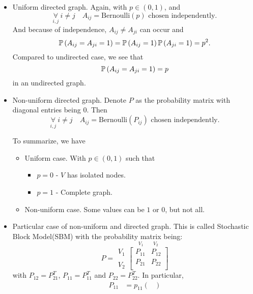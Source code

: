 \begin{itemize}
	\item Uniform directed graph. Again, with \(p\in(0, 1)\), and
	      \[
		      \underset{i, j}{\forall}\ i\neq j\quad A_{ij}= \mathrm{Bernoulli}(p) \text{ chosen independently}.
	      \]
	      And because of independence, \(A_{ij}\neq A_{ji}\) can occur and
	      \[
		      \mathbb{\MakeUppercase{P}}\left( A_{ij} = A_{ji} = 1 \right) = \mathbb{\MakeUppercase{P}}\left( A_{ij} = 1 \right) \mathbb{\MakeUppercase{P}}\left( A_{ji} = 1 \right) = p^2.
	      \]
	      Compared to undirected case, we see that
	      \[
		      \mathbb{\MakeUppercase{P}}\left( A_{ij} = A_{ji} = 1 \right) = p
	      \]
	      in an undirected graph.
	\item Non-uniform directed graph. Denote \(P\) as the probability matrix with diagonal entries being \(0\). Then
	      \[
		      \underset{i, j}{\forall}\ i\neq j\quad A_{ij} = \mathrm{Bernoulli}(P_{ij})\text{ chosen independently}.
	      \]
	      \begin{remark}
		      To summarize, we have
		      \begin{itemize}
			      \item Uniform case. With \(p\in(0, 1)\) such that
			            \begin{itemize}
				            \item \(p = 0\) - \(V\) has isolated nodes.
				            \item \(p = 1\) - Complete graph.
			            \end{itemize}
			      \item Non-uniform case. Some values can be \(1\) or \(0\), but not all.
		      \end{itemize}
	      \end{remark}
	\item Particular case of non-uniform and directed graph. This is called Stochastic Block Model(SBM) with the probability matrix being:
	      \[
		      P = \substack{V_1 \\ \\ V_2}\overset{V_1\qquad V_2}{\begin{bmatrix}
				      P_{11} & P_{12} \\
				      P_{21} & P_{22} \\
			      \end{bmatrix}}
	      \]
	      with \(P_{12} = P_{21}^{T}\), \(P_{11} = P_{11}^{T}\) and \(P_{22} = P_{22}^{T}\). In particular,
	      \[
		      \begin{alignedat}{3}
			      P_{11} &= p_{11}\begin{pmatrix}

\end{pmatrix}
\end{alignedat}\]
\end{itemize}

